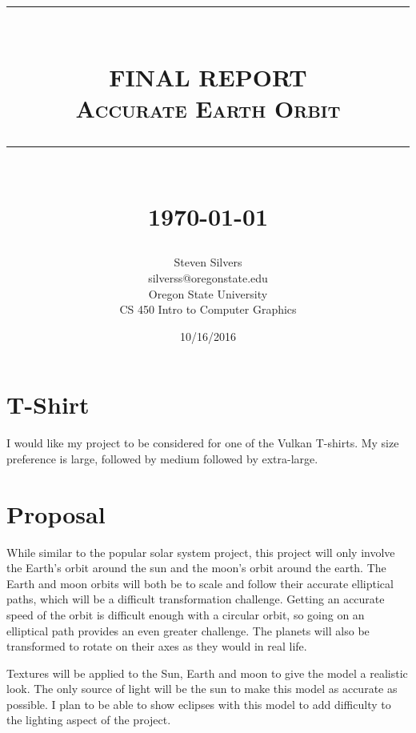 \documentclass[12pt,serif,draftclsnofoot,onecolumn]{IEEEtran}
\newcommand{\HRule}[1]{\rule{\linewidth}{#1}}
\begin{document}
	\begin{titlepage}


	\title{ \normalsize \textsc{}
			\\ [2.0cm]
			\HRule{0.5pt} \\
			\LARGE \textbf{\uppercase{Final Report}}
			\\ \normalsize \textsc{Accurate Earth Orbit}
			\HRule{2pt} \\ [0.5cm]
			\normalsize \today \vspace*{5\baselineskip}}
	\date{10/16/2016}
	
	\author{Steven Silvers \\
			silverss@oregonstate.edu \\
			Oregon State University \\
			CS 450 Intro to Computer Graphics}
	\maketitle
	\end{titlepage}
	\newpage
	\section{T-Shirt}
	\par
			I would like my project to be considered for one of the Vulkan T-shirts. My size preference is large, followed by medium followed by extra-large.
	\newline
	\section{Proposal}
	\par
			While similar to the popular solar system project, this project will only involve the Earth's orbit around the sun and the moon's orbit around the earth. The Earth and moon orbits will both be to scale and follow their accurate elliptical paths, which will be a difficult transformation challenge. Getting an accurate speed of the orbit is difficult enough with a circular orbit, so going on an elliptical path provides an even greater challenge. The planets will also be transformed to rotate on their axes as they would in real life.
	\newline
	\par
			Textures will be applied to the Sun, Earth and moon to give the model a realistic look. The only source of light will be the sun to make this model as accurate as possible. I plan to be able to show eclipses with this model to add difficulty to the lighting aspect of the project.
	\newline
\end{document}

